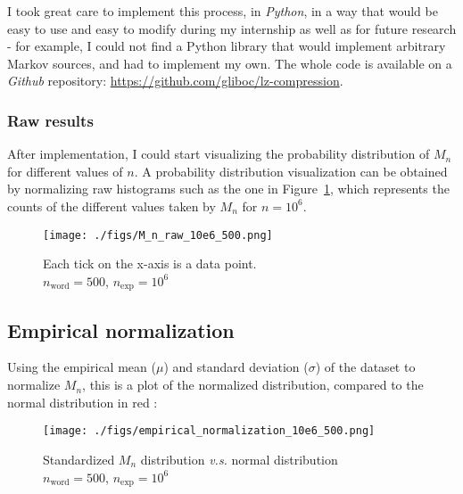 	I took  great care to implement this process, in \emph{Python}, 
	in a way that would be easy to use and easy to modify during my 
	internship as well as for future research - for example, I 
	could not find a Python library that would implement arbitrary Markov 
	sources, and had to implement my own.
	The whole code is available on a \emph{Github} repository:
	{\color{gray} \url{https://github.com/gliboc/lz-compression}}.

	\subsubsection{ Raw results }
	
After implementation, I could start visualizing the probability
distribution of $M_n$ for different values of $n$. A probability 
distribution visualization can be obtained by normalizing raw 
histograms such as the one in Figure~\ref{fig:rawhisto}, which represents the counts of 
the different values taken by $M_n$ for $n=10^6$. 


 \begin{figure}[H]
	\centering
	   \texttt{[image: ./figs/M\_n\_raw\_10e6\_500.png]}	
		\caption{Each tick on the x-axis is a data point.\\
		$n_{\text{word}} = 500$, $n_{\text{exp}} = 10^6$}
		\label{fig:rawhisto}
   \end{figure}






	\subsection{Empirical normalization}


	Using the empirical mean ($\mu$) and standard deviation ($\sigma$) of the dataset to normalize $M_n$,
	this is a plot of the normalized distribution, compared to the normal distribution 
	in red :

  \begin{figure}[H]
		\centering
		\texttt{[image: ./figs/empirical\_normalization\_10e6\_500.png]}
		\centering
		\captionsetup{justification=centering,margin=2cm}
		\caption{Standardized $M_n$ distribution \textit{v.s.} normal distribution\\
					$n_{\text{word}} = 500$, $n_{\text{exp}} = 10^6$}
	\end{figure} 

